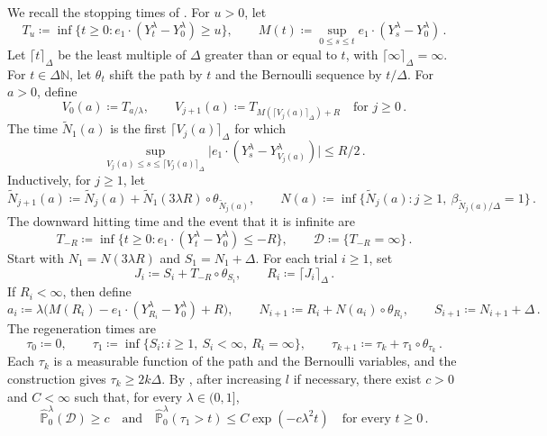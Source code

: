 \documentclass[11pt]{amsart}
\theoremstyle{definition}
\theoremstyle{remark}
\numberwithin{equation}{section}
\newcommand{\N}{\mathbb N}
\begin{document}
We recall the stopping times of \citet[(5.8)--(5.16)]{Einstein2012gantert}. For $u>0$, let
\begin{equation}\label{regen.hitting}
 T_u\coloneqq\inf\{t\geq0:e_1\cdot(Y^\lambda_t-Y^\lambda_0)\geq u\},
 \qquad M(t)\coloneqq\sup_{0\leq s\leq t}e_1\cdot(Y^\lambda_s-Y^\lambda_0)\, .
\end{equation}
Let $\lceil t\rceil_\Delta$ be the least multiple of $\Delta$ greater than or equal to $t$, with $\lceil\infty\rceil_\Delta=\infty$. For $t\in\Delta\N$, let $\theta_t$ shift the path by $t$ and the Bernoulli sequence by $t/\Delta$. For $a>0$, define
\begin{equation*}
 V_0(a)\coloneqq T_{a/\lambda},\qquad
 V_{j+1}(a)\coloneqq T_{M(\lceil V_j(a)\rceil_\Delta)+R}
 \quad\text{for }j\geq0\, .
\end{equation*}
The time $\widetilde N_1(a)$ is the first $\lceil V_j(a)\rceil_\Delta$ for which
\begin{equation*}
 \sup_{V_j(a)\leq s\leq\lceil V_j(a)\rceil_\Delta}
 \big|e_1\cdot(Y^\lambda_s-Y^\lambda_{V_j(a)})\big|\leq R/2\, .
\end{equation*}
Inductively, for $j\geq1$, let
\begin{equation*}
 \widetilde N_{j+1}(a)\coloneqq
 \widetilde N_j(a)+\widetilde N_1(3\lambda R)\circ\theta_{\widetilde N_j(a)},
 \qquad
 N(a)\coloneqq\inf\{\widetilde N_j(a):j\geq1,\ \beta_{\widetilde N_j(a)/\Delta}=1\}\, .
\end{equation*}
The downward hitting time and the event that it is infinite are
\begin{equation}\label{regen.D}
 T_{-R}\coloneqq\inf\{t\geq0:e_1\cdot(Y^\lambda_t-Y^\lambda_0)\leq-R\},
 \qquad \mathcal D\coloneqq\{T_{-R}=\infty\}\, .
\end{equation}
Start with $N_1=N(3\lambda R)$ and $S_1=N_1+\Delta$. For each trial $i\geq1$, set
\begin{equation*}
 J_i\coloneqq S_i+T_{-R}\circ\theta_{S_i},\qquad
 R_i\coloneqq\lceil J_i\rceil_\Delta\, .
\end{equation*}
If $R_i<\infty$, then define
\begin{equation*}
 a_i\coloneqq\lambda\big(M(R_i)-e_1\cdot(Y^\lambda_{R_i}-Y^\lambda_0)+R\big),
 \qquad N_{i+1}\coloneqq R_i+N(a_i)\circ\theta_{R_i},\qquad
 S_{i+1}\coloneqq N_{i+1}+\Delta\, .
\end{equation*}
The regeneration times are
\begin{equation}\label{regen.times}
 \tau_0\coloneqq0,\qquad
 \tau_1\coloneqq\inf\{S_i:i\geq1,\ S_i<\infty,\ R_i=\infty\},\qquad
 \tau_{k+1}\coloneqq\tau_k+\tau_1\circ\theta_{\tau_k}\, .
\end{equation}
Each $\tau_k$ is a measurable function of the path and the Bernoulli variables, and the construction gives $\tau_k\geq2k\Delta$. By \citet[Lemmas~5.7 and~5.8, and~(5.20)]{Einstein2012gantert}, after increasing $l$ if necessary, there exist $c>0$ and $C<\infty$ such that, for every $\lambda\in(0,1]$,
\begin{equation}\label{regen.tails}
 \widehat{\mathbb P}^\lambda_0(\mathcal D)\geq c
 \quad\text{and}\quad
 \widehat{\mathbb P}^\lambda_0(\tau_1>t)\leq C\exp(-c\lambda^2t)
 \quad\text{for every }t\geq0\, .
\end{equation}
\end{document}
